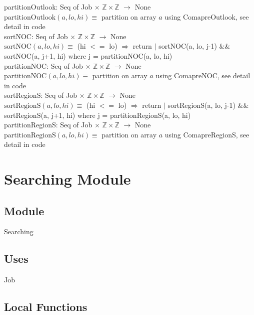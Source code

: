 \documentclass[12pt]{article}
\begin{document}
\noindent partitionOutlook: Seq of Job $\times$ $\mathbb{Z} \times \mathbb{Z}$ $ \rightarrow $ None\\
\noindent $\mbox{partitionOutlook}(a, lo, hi) \equiv$ partition on array $a$ using ComapreOutlook, see detail in code\\

\noindent sortNOC: Seq of Job $\times$ $\mathbb{Z} \times \mathbb{Z}$ $ \rightarrow $ None\\
\noindent $\mbox{sortNOC}(a, lo, hi) \equiv$ (hi $<=$ lo) $\Rightarrow$ return $|$ sortNOC(a, lo, j-1) \&\& sortNOC(a, j+1, hi) where j = partitionNOC(a, lo, hi)\\

\noindent partitionNOC: Seq of Job $\times$ $\mathbb{Z} \times \mathbb{Z}$ $ \rightarrow $ None\\
\noindent $\mbox{partitionNOC}(a, lo, hi) \equiv$ partition on array $a$ using ComapreNOC, see detail in code\\

\noindent sortRegionS: Seq of Job $\times$ $\mathbb{Z} \times \mathbb{Z}$ $ \rightarrow $ None\\
\noindent $\mbox{sortRegionS}(a, lo, hi) \equiv$ (hi $<=$ lo) $\Rightarrow$ return $|$ sortRegionS(a, lo, j-1) \&\& sortRegionS(a, j+1, hi) where j = partitionRegionS(a, lo, hi)\\

\noindent partitionRegionS: Seq of Job $\times$ $\mathbb{Z} \times \mathbb{Z}$ $ \rightarrow $ None\\
\noindent $\mbox{partitionRegionS}(a, lo, hi) \equiv$ partition on array $a$ using ComapreRegionS, see detail in code\\

\section* {Searching Module}
\subsection*{Module}

Searching

\subsection* {Uses}

Job

\subsection*{Local Functions}
\end{document}

